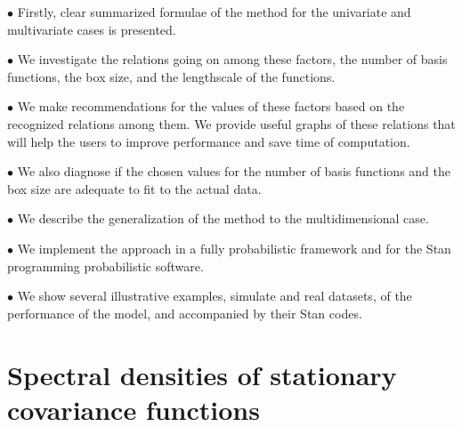 \documentclass[]{interact}
\theoremstyle{plain}%
\theoremstyle{definition}
\theoremstyle{remark}
\begin{document}
\vspace{2mm}
$\bullet$ Firstly, clear summarized formulae of the method for the univariate and multivariate cases is presented. 

\vspace{2mm}
$\bullet$ We investigate the relations going on among these factors, the number of basis functions, the box size, and the lengthscale of the functions.

\vspace{2mm}
$\bullet$ We make recommendations for the values of these factors based on the recognized relations among them. We provide useful graphs of these relations that will help the users to improve performance and save time of computation.

\vspace{2mm}
$\bullet$ We also diagnose if the chosen values for the number of basis functions and the box size are adequate to fit to the actual data.

\vspace{2mm}
$\bullet$ We describe the generalization of the method to the multidimensional case.

\vspace{2mm}
$\bullet$ We implement the approach in a fully probabilistic framework and for the Stan programming probabilistic software.

\vspace{2mm}
$\bullet$ We show several illustrative examples, simulate and real datasets, of the performance of the model, and accompanied by their Stan codes.

 

\section{Spectral densities of stationary covariance functions}
\end{document}
